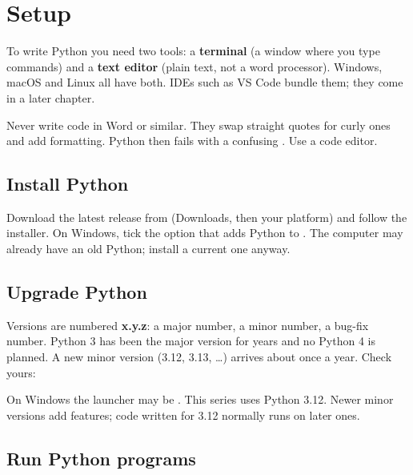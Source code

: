 \section{Setup}

To write Python you need two tools: a \textbf{terminal} (a window where you type
commands) and a \textbf{text editor} (plain text, not a word processor). Windows,
macOS and Linux all have both. IDEs such as VS Code bundle them; they come in a
later chapter.

\begin{trap}
Never write code in Word or similar. They swap straight quotes for curly ones
and add formatting. Python then fails with a confusing . Use a code editor.
\end{trap}

\subsection{Install Python}

Download the latest release from  (Downloads, then your platform)
and follow the installer. On Windows, tick the option that adds Python to .
The computer may already have an old Python; install a current one anyway.

\subsection{Upgrade Python}

Versions are numbered \textbf{x.y.z}: a major number, a minor number, a bug-fix number.
Python 3 has been the major version for years and no Python 4 is planned. A new
minor version (3.12, 3.13, \ldots) arrives about once a year. Check yours:


On Windows the launcher may be . This series uses Python 3.12. Newer minor
versions add features; code written for 3.12 normally runs on later ones.

\subsection{Run Python programs}

